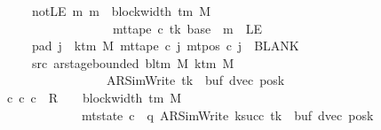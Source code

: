 \begin{isabellebody}
\ \ \ \ \ \ \ notLE{\isacharcolon}{\kern0pt}\ {\isachardoublequoteopen}{\isasymAnd}m{\isachardot}{\kern0pt}\ m\ {\isasymle}\ block{\isacharunderscore}{\kern0pt}width\ {\isacharparenleft}{\kern0pt}{\isasymGamma}{\isacharunderscore}{\kern0pt}tm\ M{\isacharparenright}{\kern0pt}\isanewline
\ \ \ \ \ \ \ \ \ \ \ \ \ \ \ \ \ \ \ {\isasymLongrightarrow}\ mt{\isacharunderscore}{\kern0pt}tape\ c{\isacharprime}{\kern0pt}\ tk\ {\isacharparenleft}{\kern0pt}base\ {\isacharplus}{\kern0pt}\ m{\isacharparenright}{\kern0pt}\ {\isasymnoteq}\ LE{}{\isachardoublequoteclose}\isanewline
\ \ \ \ \ \ \ pad{}{\isacharcolon}{\kern0pt}\ {\isachardoublequoteopen}{\isasymforall}j\ {\isasymge}\ k{\isacharunderscore}{\kern0pt}tm\ M{\isachardot}{\kern0pt}\ mt{\isacharunderscore}{\kern0pt}tape\ c{\isacharprime}{\kern0pt}\ j\ {\isacharparenleft}{\kern0pt}mt{\isacharunderscore}{\kern0pt}pos\ c{\isacharprime}{\kern0pt}\ j{\isacharparenright}{\kern0pt}\ {\isacharequal}{\kern0pt}\ BLANK{}{\isachardoublequoteclose}\isanewline
\ \ \ \ \ \ \ src{}{\isacharcolon}{\kern0pt}\ {\isachardoublequoteopen}ar{\isacharunderscore}{\kern0pt}stage{\isacharunderscore}{\kern0pt}bounded\ {\isacharparenleft}{\kern0pt}bl{\isacharunderscore}{\kern0pt}tm\ M{\isacharparenright}{\kern0pt}\ {\isacharparenleft}{\kern0pt}k{\isacharunderscore}{\kern0pt}tm\ M{\isacharparenright}{\kern0pt}\isanewline
\ \ \ \ \ \ \ \ \ \ \ \ \ \ \ \ \ \ \ {\isacharparenleft}{\kern0pt}AR{\isacharunderscore}{\kern0pt}SimWrite{\isacharcomma}{\kern0pt}\ tk{\isacharcomma}{\kern0pt}\ {}{\isacharcomma}{\kern0pt}\ buf{\isacharcomma}{\kern0pt}\ dvec{\isacharcomma}{\kern0pt}\ posk{\isacharparenright}{\kern0pt}{\isachardoublequoteclose}\isanewline
\ \ \ {\isachardoublequoteopen}{\isasymexists}c{\isacharprime}{\kern0pt}{\isacharprime}{\kern0pt}{\isachardot}{\kern0pt}\ {\isacharparenleft}{\kern0pt}c{\isacharprime}{\kern0pt}{\isacharcomma}{\kern0pt}\ c{\isacharprime}{\kern0pt}{\isacharprime}{\kern0pt}{\isacharparenright}{\kern0pt}\ {\isasymin}\ R{\isacharprime}{\kern0pt}\ {\isacharcircum}{\kern0pt}{\isacharcircum}{\kern0pt}\ {\isacharparenleft}{\kern0pt}{}\ {\isacharasterisk}{\kern0pt}\ block{\isacharunderscore}{\kern0pt}width\ {\isacharparenleft}{\kern0pt}{\isasymGamma}{\isacharunderscore}{\kern0pt}tm\ M{\isacharparenright}{\kern0pt}{\isacharparenright}{\kern0pt}\isanewline
\ \ \ \ \ \ \ \ \ \ \ \ \ \ {\isasymand}\ mt{\isacharunderscore}{\kern0pt}state\ c{\isacharprime}{\kern0pt}{\isacharprime}{\kern0pt}\ {\isacharequal}{\kern0pt}\ {\isacharparenleft}{\kern0pt}q{\isacharcomma}{\kern0pt}\ AR{\isacharunderscore}{\kern0pt}SimWrite{\isacharcomma}{\kern0pt}\ k{\isacharunderscore}{\kern0pt}succ\ tk{\isacharcomma}{\kern0pt}\ {}{\isacharcomma}{\kern0pt}\ buf{\isacharcomma}{\kern0pt}\ dvec{\isacharcomma}{\kern0pt}\ posk{\isacharparenright}{\kern0pt}\isanewline

\end{isabellebody}
